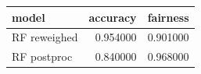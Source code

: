 \begin{tabular}{lrr}
\toprule
model & accuracy & fairness \\
\midrule
RF reweighed & 0.954000 & 0.901000 \\
RF postproc & 0.840000 & 0.968000 \\
\bottomrule
\end{tabular}
